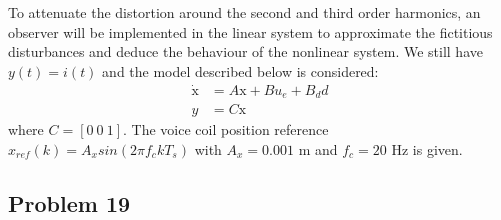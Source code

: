 To attenuate the distortion around the second and third order harmonics, an observer will be implemented in the linear system to approximate the fictitious disturbances and deduce the behaviour of the nonlinear system.
We still have $y(t) = i(t)$ and the model described below is considered:
\begin{align*}
\dot{\text{x}} &= A\text{x} + Bu_e + B_d d \\
y &= C \text{x}
\end{align*}
where $C = [0 \ 0 \ 1]$.
The voice coil position reference $x_{ref}(k) = A_x sin(2\pi f_c kT_s)$ with $A_x = 0.001$ m and $f_c = 20$ Hz is given. 

\subsection*{Problem 19}


